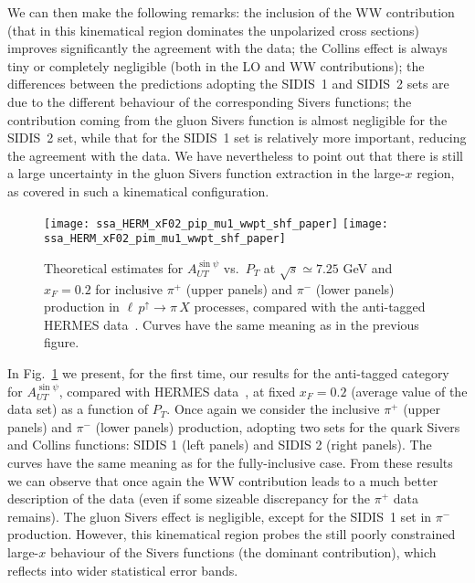\documentclass[nofootinbib,superscriptaddress,aps]{revtex4}
\newcommand{\pup}{p^\uparrow}
\begin{document}
We can then make the following remarks: the inclusion of the WW contribution (that in this kinematical region dominates the unpolarized cross sections) improves significantly the agreement with the data; the Collins effect is always tiny or completely negligible (both in the LO and WW contributions); the differences between the predictions adopting the SIDIS~1 and SIDIS~2 sets are due to the different behaviour of the corresponding Sivers functions; the contribution coming from the gluon Sivers function is almost negligible for the SIDIS~2 set, while that for the SIDIS~1 set is relatively more important, reducing the agreement with the data. We have nevertheless to point out that there is still a large uncertainty in the gluon Sivers function extraction in the large-$x$ region, as covered in such a kinematical configuration.


\begin{figure}[ht!]
 \centering
 \texttt{[image: ssa\_HERM\_xF02\_pip\_mu1\_wwpt\_shf\_paper]}
 \texttt{[image: ssa\_HERM\_xF02\_pim\_mu1\_wwpt\_shf\_paper]}
 \caption{Theoretical estimates for $A_{UT}^{\sin\psi}$ vs.~$P_T$ at $\sqrt{s}\simeq 7.25$ GeV and $x_F = 0.2$ for inclusive $\pi^+$ (upper panels) and $\pi^-$ (lower panels) production in $\ell \, \pup \to \pi \, X$ processes, compared with the anti-tagged HERMES data~\cite{Airapetian:2013bim}. Curves have the same meaning as in the previous figure.
}
  \label{fig:SSA-pi-xf02}
\end{figure}

In Fig.~\ref{fig:SSA-pi-xf02} we present, for the first time, our results for the anti-tagged category for $A_{UT}^{\sin\psi}$, compared with HERMES data~\cite{Airapetian:2013bim}, at fixed $x_F=0.2$ (average value of the data set) as a function of $P_T$. Once again we consider the inclusive $\pi^+$ (upper panels) and $\pi^-$ (lower panels) production, adopting two sets for the quark Sivers and Collins functions: SIDIS 1 (left panels) and SIDIS 2 (right panels). The curves have the same meaning as for the fully-inclusive case. From these results we can observe that once again the WW contribution leads to a much better description of the data (even if some sizeable discrepancy for the $\pi^+$ data remains). The gluon Sivers effect is negligible, except for the SIDIS~1 set in $\pi^-$ production. However, this kinematical region probes the still poorly constrained large-$x$ behaviour of the Sivers functions (the dominant contribution), which reflects into wider statistical error bands.
\end{document}
